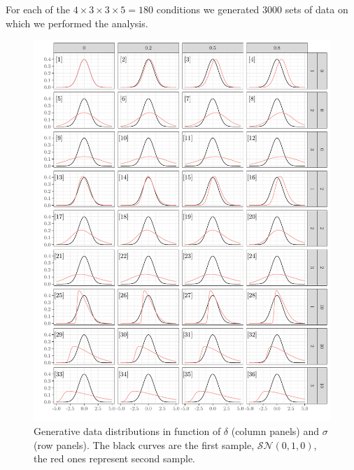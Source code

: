 \documentclass[twocolumn]{article}\usepackage[]{graphicx}\usepackage[]{xcolor}
\makeatletter
\def\maxwidth{ %
  \ifdim\Gin@nat@width>\linewidth
    \linewidth
  \else
    \Gin@nat@width
  \fi
}
\newenvironment{knitrout}{}{} %
\makeatother
\begin{document}
For each of the $4 \times 3 \times 3 \times 5 = 180$ conditions we generated 3000 sets of data on which we performed the analysis. 








\begin{figure}
\begin{knitrout}
\color{fgcolor}

{\centering \includegraphics[width=\maxwidth]{figure/alpha0-1} 

}


\end{knitrout}
\caption{Generative data distributions in function of $\delta$ (column panels) and $\sigma$ (row panels). The black curves are the first sample, $\mathcal{SN}(0,1,0)$, the red ones represent second sample.\label{fig:alpha0}}
\end{figure}
\end{document}
